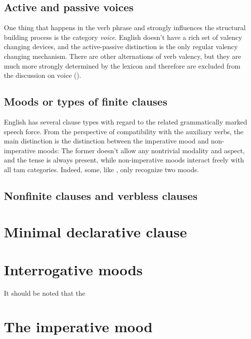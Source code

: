 \documentclass[UTF8, a4paper, oneside, scheme=plain]{ctexrep}
\begin{document}
\subsection{Active and passive voices}

One thing that happens in the verb phrase 
and strongly influences the structural building process is the category \emph{voice}.
English doesn't have a rich set of valency changing devices,
and the active-passive distinction is the only regular valency changing mechanism.
There are other alternations of verb valency, 
but they are much more strongly determined by the lexicon 
and therefore are excluded from the discussion on voice ().

\subsection{Moods or types of finite clauses}\label{sec:moods}

English has several clause types with regard to the related grammatically marked speech force.
From the perspective of compatibility with the auxiliary verbs,
the main distinction is the distinction between the imperative mood and non-imperative moods:
The former doesn't allow any nontrivial modality and aspect,
and the tense is always present,
while non-imperative moods interact freely with all \acs{tam} categories.
Indeed, some, like \citet{dixon2005semantic}, only recognize two moods.

\subsection{Nonfinite clauses and verbless clauses}\label{sec:clause.nonfinite-clause}

\section{Minimal declarative clause}



\section{Interrogative moods}

It should be noted that the 

\section{The imperative mood}
\end{document}
